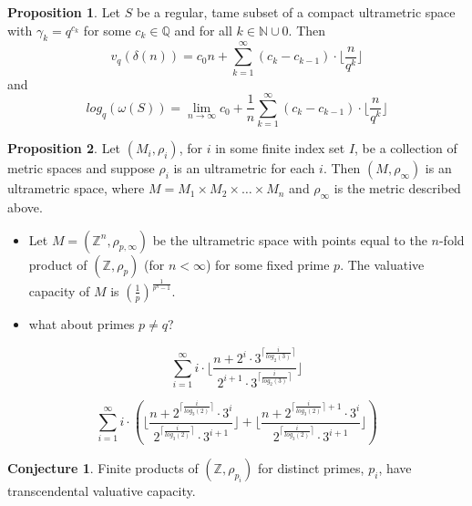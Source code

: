 \documentclass{beamer}
\theoremstyle{definition}
\newtheorem{proposition}{Proposition}
\newtheorem{conjecture}{Conjecture}
\begin{document}
\begin{frame}
\begin{proposition}
	Let $S$ be a regular, tame subset of a compact ultrametric space with $\gamma_k = q^{c_k}$ for some $c_k \in \mathbb{Q}$ and for all $k \in \mathbb{N} \cup 0$. Then 
	\[v_{q}(\delta(n)) =  c_0n + \sum_{k=1}^{\infty} (c_{k} - c_{k-1}) \cdot \lfloor\frac{n}{q^{k}}\rfloor \]
	and 
	\[log_q(\omega(S)) = \lim_{n\to\infty} c_0 + \frac{1}{n}\sum_{k=1}^{\infty} (c_{k} - c_{k-1}) \cdot \lfloor\frac{n}{q^{k}}\rfloor  \]
\end{proposition}
\end{frame}


\begin{frame}
\begin{proposition}
	Let $(M_i, \rho_i)$, for $i$ in some finite index set $I$, be a collection of metric spaces and suppose $\rho_i$ is an ultrametric for each $i$. Then $(M,\rho_\infty)$ is an ultrametric space, where $M=M_1 \times M_2 \times \ldots \times M_n$ and $\rho_\infty$ is the metric described above.
\end{proposition}
\pause
\begin{itemize}
	\item Let $M=(\mathbb{Z}^n, \rho_{p, \infty})$ be the ultrametric space with points equal to the $n$-fold product of $(\mathbb{Z}, \rho_p)$ (for $n < \infty$) for some fixed prime $p$. The valuative capacity of $M$ is  $(\frac{1}{p})^{\frac{1}{p^n-1}}$.
	\pause
	\item what about primes $p \neq q$?
\end{itemize}
\end{frame}

\begin{frame}
\[\sum_{i=1}^\infty i \cdot \lfloor\frac{n + 2^i \cdot 3^{\lceil \frac{i}{log_2(3)}\rceil}}{2^{i+1}\cdot 3^{\lceil \frac{i}{log_2(3)}\rceil}} \rfloor\]

\pause
\[\sum_{i=1}^\infty i \cdot (\lfloor\frac{n + 2^{\lceil \frac{i}{log_3(2)}\rceil} \cdot 3^i}{2^{\lceil \frac{i}{log_3(2)}\rceil}\cdot 3^{i+1}} \rfloor + \lfloor\frac{n + 2^{\lceil \frac{i}{log_3(2)}\rceil+1} \cdot 3^i}{2^{\lceil \frac{i}{log_3(2)}\rceil}\cdot 3^{i+1}} \rfloor)
\]

\end{frame}

\begin{frame}
\begin{conjecture} Finite products of $(\mathbb{Z}, \rho_{p_i})$ for distinct primes, $p_i$, have transcendental valuative capacity.\\ \end{conjecture}
\end{frame}
\end{document}
